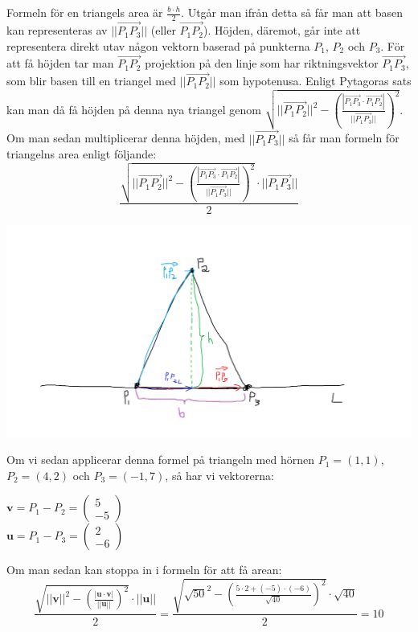 Formeln för en triangels area är $\frac{b \cdot h}{2}$.
Utgår man ifrån detta så får man att basen kan representeras av $||\overrightarrow{P_{1}P_{3}}||$ (eller $\overrightarrow{P_{1}P_{2}}$).
Höjden, däremot, går inte att representera direkt utav någon vektorn baserad på punkterna $P_{1}$, $P_{2}$ och $P_{3}$.
För att få höjden tar man $\overrightarrow{P_{1}P_{2}}$ projektion på den linje som har riktningsvektor $\overrightarrow{P_{1}P_{3}}$, 
som blir basen till en triangel med $||\overrightarrow{P_{1}P_{2}}||$ som hypotenusa.
Enligt Pytagoras sats kan man då få höjden på denna nya triangel genom $\sqrt{ ||\overrightarrow{P_{1}P_{2}}||^{2} - (\frac{|\overrightarrow{P_{1}P_{3}}\cdot \overrightarrow{P_{1}P_{2}}|}{||\overrightarrow{P_{1}P_{3}}||})^{2}}$.
Om man sedan multiplicerar denna höjden, med $||\overrightarrow{P_{1}P_{3}}||$ så får man formeln för triangelns area enligt följande:\\
\begin{equation}
        \frac{\sqrt{ ||\overrightarrow{P_{1}P_{2}}||^{2} - (\frac{|\overrightarrow{P_{1}P_{3}}\cdot \overrightarrow{P_{1}P_{2}}|}{||\overrightarrow{P_{1}P_{3}}||})^{2}}\cdot ||\overrightarrow{P_{1}P_{3}}||}{2}
\end{equation}

\begin{center}
    \includegraphics[scale=0.15]{imgs/bild.png}
\end{center}

Om vi sedan applicerar denna formel på triangeln med hörnen $P_{1}=(1,1)$, $P_{2}=(4,2)$ och $P_{3}=(-1,7)$, så har vi vektorerna:\\
\begin{center}
    $\bm{v} = P_{1}-P_{2} = \begin{pmatrix}5\\-5\end{pmatrix}$\\
    $\bm{u}=P_{1}-P_{3} = \begin{pmatrix}2\\-6\end{pmatrix}$\\
\end{center}

Om man sedan kan stoppa in i formeln för att få arean:
\begin{equation}
    \frac{\sqrt{||\bm{v}||^{2}-(\frac{|\bm{u}\cdot \bm{v}|}{||\bm{u}||})^{2}}\cdot ||\bm{u}||}{2}=
    \frac{\sqrt{\sqrt{50}^{2}-(\frac{5\cdot 2 + (-5)\cdot (-6)}{\sqrt{40}})^{2}}\cdot \sqrt{40}}{2}=
    10
\end{equation}